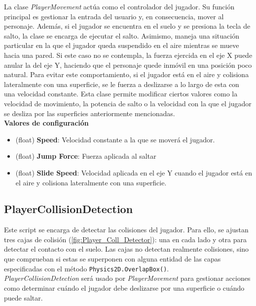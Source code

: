 La clase \textit{PlayerMovement} actúa como el controlador del jugador. Su función principal es gestionar la entrada del usuario y, en consecuencia, mover al personaje. Además, si el jugador se encuentra en el suelo y se presiona la tecla de salto, la clase se encarga de ejecutar el salto.
Asimismo, maneja una situación particular en la que el jugador queda suspendido en el aire mientras se mueve hacia una pared. Si este caso no se contempla, la fuerza ejercida en el eje X puede anular la del eje Y, haciendo que el personaje quede inmóvil en una posición poco natural. Para evitar este comportamiento, si el jugador está en el aire y colisiona lateralmente con una superficie, se le fuerza a deslizarse a lo largo de esta con una velocidad constante.
Esta clase permite modificar ciertos valores como la velocidad de movimiento, la potencia de salto o la velocidad con la que el jugador se desliza por las superficies anteriormente mencionadas.\\

\textbf{Valores de configuración}
\begin{itemize}
	\item (float) \textbf{Speed}: Velocidad constante a la que se moverá el jugador.
	\item (float) \textbf{Jump Force}: Fuerza aplicada al saltar
	\item (float) \textbf{Slide Speed}: Velocidad aplicada en el eje Y cuando el jugador está en el aire y colisiona lateralmente con una superficie.
\end{itemize}

\subsection{PlayerCollisionDetection}

Este script se encarga de detectar las colisiones del jugador. Para ello, se ajustan tres cajas de colisión (\autoref{fig:Player_Coll_Detector}): una en cada lado y otra para detectar el contacto con el suelo. Las cajas no detectan realmente colisiones, sino que comprueban si estas se superponen con alguna entidad de las capas especificadas con el método \texttt{Physics2D.OverlapBox()}.\\

\textit{PlayerCollisionDetection} será usado por \textit{PlayerMovement} para gestionar acciones como determinar cuándo el jugador debe deslizarse por una superficie o cuándo puede saltar.\\

